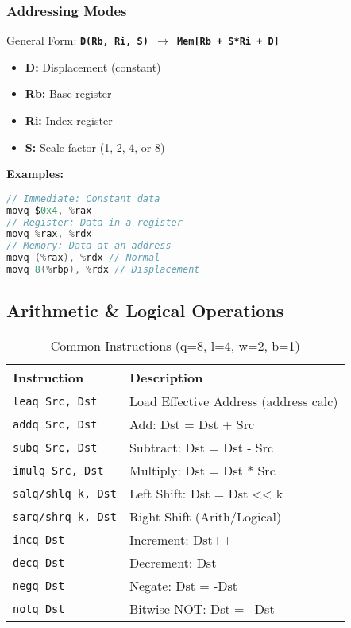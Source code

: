 \documentclass[10pt, twocolumn]{article}
\begin{document}
\subsubsection*{Addressing Modes}
General Form: \textbf{\texttt{D(Rb, Ri, S) $\rightarrow$ Mem[Rb + S*Ri + D]}}
\begin{itemize}
    \item \textbf{D:} Displacement (constant)
    \item \textbf{Rb:} Base register
    \item \textbf{Ri:} Index register
    \item \textbf{S:} Scale factor (1, 2, 4, or 8)
\end{itemize}
\textbf{Examples:}
\begin{lstlisting}[language=c, basicstyle=\ttfamily\tiny]
// Immediate: Constant data
movq $0x4, %rax
// Register: Data in a register
movq %rax, %rdx
// Memory: Data at an address
movq (%rax), %rdx // Normal
movq 8(%rbp), %rdx // Displacement
\end{lstlisting}

\subsection*{Arithmetic \& Logical Operations}
\begin{table}[h]
    \centering
    \caption{Common Instructions (q=8, l=4, w=2, b=1)}
    \scriptsize
    \begin{tabular}{@{}ll@{}}
        \toprule
        Instruction & Description \\
        \midrule
        \texttt{leaq Src, Dst} & Load Effective Address (address calc) \\
        \texttt{addq Src, Dst} & Add: Dst = Dst + Src \\
        \texttt{subq Src, Dst} & Subtract: Dst = Dst - Src \\
        \texttt{imulq Src, Dst} & Multiply: Dst = Dst * Src \\
        \texttt{salq/shlq k, Dst} & Left Shift: Dst = Dst << k \\
        \texttt{sarq/shrq k, Dst} & Right Shift (Arith/Logical) \\
        \texttt{incq Dst} & Increment: Dst++ \\
        \texttt{decq Dst} & Decrement: Dst-- \\
        \texttt{negq Dst} & Negate: Dst = -Dst \\
        \texttt{notq Dst} & Bitwise NOT: Dst = ~Dst \\
        \bottomrule
    \end{tabular}
\end{table}
\end{document}
